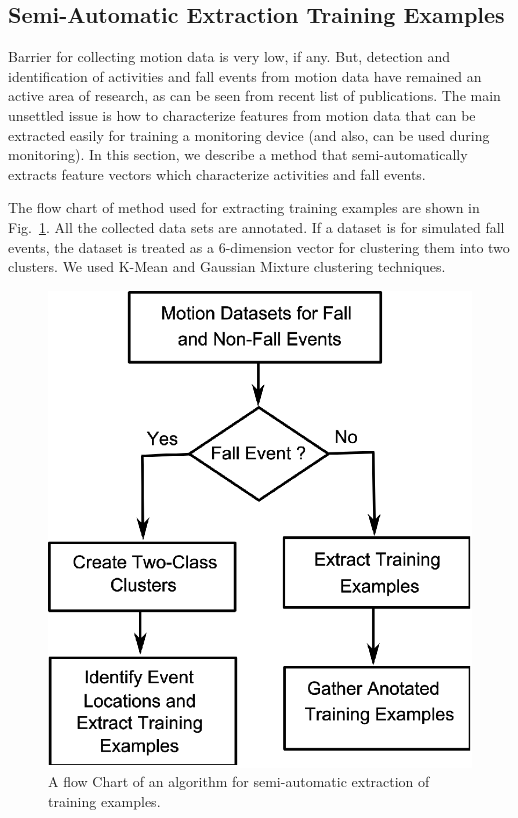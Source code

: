 \documentclass{IEEEtran}
\begin{document}
\subsection{Semi-Automatic  Extraction Training Examples}

Barrier for collecting motion data is very low, if any. But, detection and identification of activities and fall events from motion data have remained an active area of research, as can be seen from recent list of publications. The main unsettled issue is how to characterize features from motion data that can be extracted easily for training  a monitoring device (and  also, can be used during monitoring). In this section, we describe a method that semi-automatically extracts feature vectors which characterize activities and fall events.

The flow chart of method used for extracting training examples are shown in Fig.~\ref{fig:FlowChartforAlgorTrainingExamples}. All the collected data sets are annotated. If a dataset is for simulated fall events, the dataset is treated as a 6-dimension vector for clustering them into two clusters. We used K-Mean and Gaussian Mixture clustering techniques. 

\begin{figure}[htb]
	\centering
		\includegraphics[width = 
		0.74\columnwidth]{figures/FlowChartAlgoForTrainingExamples.eps}
	\caption{A flow Chart of an algorithm for semi-automatic extraction of training examples.}
	\label{fig:FlowChartforAlgorTrainingExamples}
\end{figure}
\end{document}
